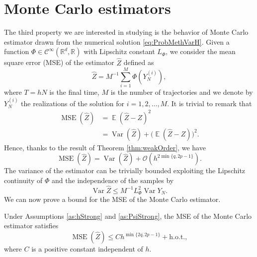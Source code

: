 \documentclass{siamart1116}
\numberwithin{theorem}{section}
\newcommand{\R}{\mathbb{R}}
\newcommand{\OO}{\mathcal{O}}
\newcommand{\Var}{\operatorname{Var}}
\newcommand{\E}{\operatorname{\mathbb{E}}}
\newcommand{\MSE}{\operatorname{MSE}}
\newcommand{\sksum}{\textstyle\sum}
\begin{document}
\section{Monte Carlo estimators}

The third property we are interested in studying is the behavior of Monte Carlo estimator drawn from the numerical solution \eqref{eq:ProbMethVarH}. Given a function $\Phi\in\mathcal{C}^\infty(\R^d, \R)$ with Lipschitz constant $L_\Phi$, we consider the mean square error (MSE) of the estimator $\hat Z$ defined as
\begin{equation}\label{eq:MSE}
	\hat Z = M^{-1} \sksum_{i = 1}^M \Phi(Y_N^{(i)}),
\end{equation}
where $T = hN$ is the final time, $M$ is the number of trajectories and we denote by $Y_N^{(i)}$ the realizations of the solution for $i = 1, 2, \ldots, M$. It is trivial to remark that 
\begin{equation}
\begin{aligned}
	\MSE(\hat Z) &= \E(\hat Z - Z)^2\\
	&= \Var(\hat Z) + \big(\E(\hat Z - Z)\big)^2.
\end{aligned}
\end{equation}
Hence, thanks to the result of Theorem \ref{thm:weakOrder}, we have
\begin{equation}\label{eq:MSEDecomposition}
	\MSE(\hat Z) = \Var(\hat Z) + \OO(h^{2\min\{q, 2p - 1\}}).
\end{equation}
The variance of the estimator can be trivially bounded exploiting the Lipschitz continuity of $\Phi$ and the independence of the samples by
\begin{equation}\label{eq:MSELipschitz}
	\Var\hat Z \leq M^{-1} L_\Phi^2 \Var Y_N.
\end{equation}
We can now prove a bound for the MSE of the Monte Carlo estimator.
\begin{theorem}\label{thm:MSEMonteCarlo} Under Assumptions \ref{as:hStrong} and \ref{as:PsiStrong}, the MSE of the Monte Carlo estimator satisfies
	\begin{equation}
		\MSE(\hat Z) \leq C h^{\min\{2q, 2p -1\}} + \mathrm{h.o.t.},
	\end{equation}
	where $C$ is a positive constant independent of $h$.
\end{theorem}
\end{document}
